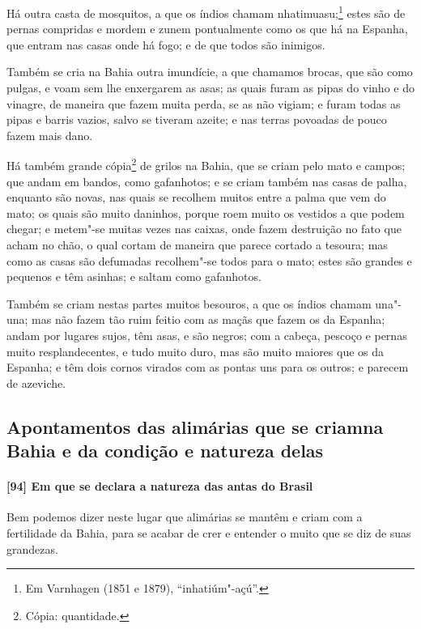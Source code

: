\begin{linenumbers}
Há outra casta de mosquitos, a que os índios chamam nhatimuasu;\footnote{ Em Varnhagen
(1851 e 1879), ``inhatiúm"-açú''.} estes são de pernas compridas e mordem e zunem
pontualmente como os que há na Espanha, que entram nas casas onde há fogo; e de que todos
são inimigos.

Também se cria na Bahia outra imundície, a que chamamos brocas, que são como pulgas, e
voam sem lhe enxergarem as asas; as quais furam as pipas do vinho e do vinagre, de maneira
que fazem muita perda, se as não vigiam; e furam todas as pipas e barris vazios, salvo se
tiveram azeite; e nas terras povoadas de pouco fazem mais dano.

Há também grande cópia\footnote{ Cópia: quantidade.} de grilos na Bahia, que se criam pelo
mato e campos; que andam em bandos, como gafanhotos; e se criam também nas
casas de palha, enquanto são novas, nas quais se recolhem muitos entre a palma que vem do
mato; os quais são muito daninhos, porque roem muito os vestidos a que podem chegar; e
metem"-se muitas vezes nas caixas, onde fazem destruição no fato que acham no chão, o qual
cortam de maneira que parece cortado a tesoura; mas como as casas são defumadas
recolhem"-se todos para o mato; estes são grandes e pequenos e têm asinhas; e saltam como
gafanhotos.

Também se criam nestas partes muitos besouros, a que os índios chamam una"-una; mas não
fazem tão ruim feitio com as maçãs que fazem os da Espanha; andam por lugares sujos, têm
asas, e são negros; com a cabeça, pescoço e pernas muito resplandecentes, e tudo muito
duro, mas são muito maiores que os da Espanha; e têm dois cornos virados com as pontas uns
para os outros; e parecem de azeviche.

\subsection{Apontamentos das alimárias que se criam\break na Bahia e da condição e natureza
delas}

\paragraph{[94] Em que se declara a natureza das antas do Brasil}\quad
Bem podemos dizer neste lugar que alimárias se mantêm e criam com a fertilidade da Bahia,
para se acabar de crer e entender o muito que se diz de suas grandezas.


\end{linenumbers}
